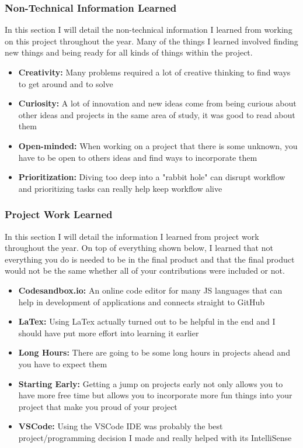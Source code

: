 \documentclass[draftclsnofoot, onecolumn, compsoc, 10pt]{IEEEtran}
\begin{document}
\subsubsection{Non-Technical Information Learned}
In this section I will detail the non-technical information I learned from working on this project throughout the year. Many of the things I learned involved finding new things and being ready for all kinds of things within the project. 
\begin{itemize}
    \item \textbf{Creativity:} Many problems required a lot of creative thinking to find ways to get around and to solve
    \item \textbf{Curiosity:} A lot of innovation and new ideas come from being curious about other ideas and projects in the same area of study, it was good to read about them
    \item \textbf{Open-minded:} When working on a project that there is some unknown, you have to be open to others ideas and find ways to incorporate them 
    \item \textbf{Prioritization:} Diving too deep into a "rabbit hole" can disrupt workflow and prioritizing tasks can really help keep workflow alive
\end{itemize}
\subsubsection{Project Work Learned}
In this section I will detail the information I learned from project work throughout the year.  On top of everything shown below, I learned that not everything you do is needed to be in the final product and that the final product would not be the same whether all of your contributions were included or not. 
\begin{itemize}
    \item \textbf{Codesandbox.io:} An online code editor for many JS languages that can help in development of applications and connects straight to GitHub
    \item \textbf{LaTex:} Using LaTex actually turned out to be helpful in the end and I should have put more effort into learning it earlier
    \item \textbf{Long Hours:} There are going to be some long hours in projects ahead and you have to expect them
    \item \textbf{Starting Early:} Getting a jump on projects early not only allows you to have more free time but allows you to incorporate more fun things into your project that make you proud of your project
    \item \textbf{VSCode:} Using the VSCode IDE was probably the best project/programming decision I made and really helped with its IntelliSense
\end{itemize}
\end{document}
